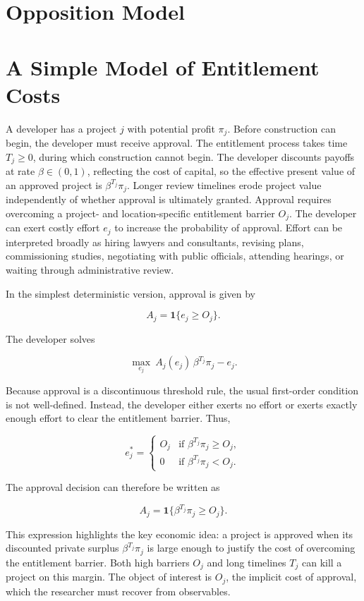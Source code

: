 \documentclass[12pt]{article}
\theoremstyle{definition}
\begin{document}
\section{Opposition Model}
\section{A Simple Model of Entitlement Costs}

A developer has a project $j$ with potential profit $\pi_j$. Before construction can begin, the developer must receive approval. The entitlement process takes time $T_j \geq 0$, during which construction cannot begin. The developer discounts payoffs at rate $\beta \in (0,1)$, reflecting the cost of capital, so the effective present value of an approved project is $\beta^{T_j}\pi_j$. Longer review timelines erode project value independently of whether approval is ultimately granted. Approval requires overcoming a project- and location-specific entitlement barrier $O_j$. The developer can exert costly effort $e_j$ to increase the probability of approval. Effort can be interpreted broadly as hiring lawyers and consultants, revising plans, commissioning studies, negotiating with public officials, attending hearings, or waiting through administrative review.

In the simplest deterministic version, approval is given by

\[
A_j = \mathbf{1}\{e_j \geq O_j\}.
\]

The developer solves

\[
\max_{e_j} \ A_j(e_j)\,\beta^{T_j}\pi_j - e_j.
\]

Because approval is a discontinuous threshold rule, the usual first-order condition is not well-defined. Instead, the developer either exerts no effort or exerts exactly enough effort to clear the entitlement barrier. Thus,

\[
e_j^* =
\begin{cases}
O_j & \text{if } \beta^{T_j}\pi_j \geq O_j, \\
0 & \text{if } \beta^{T_j}\pi_j < O_j.
\end{cases}
\]

The approval decision can therefore be written as

\[
A_j = \mathbf{1}\{\beta^{T_j}\pi_j \geq O_j\}.
\]

This expression highlights the key economic idea: a project is approved when its discounted private surplus $\beta^{T_j}\pi_j$ is large enough to justify the cost of overcoming the entitlement barrier. Both high barriers $O_j$ and long timelines $T_j$ can kill a project on this margin. The object of interest is $O_j$, the implicit cost of approval, which the researcher must recover from observables.
\end{document}
